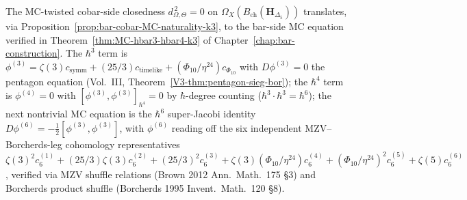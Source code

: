 \begin{remark}
\label{rem:cobar-MC-verification-k3}
The MC-twisted cobar-side closedness
$d_{\Omega,\Theta}^{\,2}=0$ on
$\Omega_X(B_{\mathrm{ch}}(\mathbf{H}_{\Delta_5}))$ translates, via
Proposition~\ref{prop:bar-cobar-MC-naturality-k3}, to the bar-side MC
equation verified in
Theorem~\ref{thm:MC-hbar3-hbar4-k3} of Chapter~\ref{chap:bar-construction}.
The $\hbar^3$ term is $\phi^{(3)} = \zeta(3)c_{\mathrm{symm}} +
(25/3)c_{\mathrm{timelike}} + (\Phi_{10}/\eta^{24})c_{\Phi_{10}}$
with $D\phi^{(3)}=0$ the pentagon equation
(Vol.~III, Theorem~\ref{V3-thm:pentagon-sieg-bor});
the $\hbar^4$ term is $\phi^{(4)}=0$ with
$[\phi^{(3)},\phi^{(3)}]_{\hbar^4}=0$ by $\hbar$-degree counting
($\hbar^3\cdot\hbar^3 = \hbar^6$); the next nontrivial MC
equation is the $\hbar^6$ super-Jacobi identity
$D\phi^{(6)} = -\tfrac{1}{2}[\phi^{(3)},\phi^{(3)}]$,
with $\phi^{(6)}$ reading off the six independent
MZV--Borcherds-leg cohomology representatives
$\zeta(3)^2 c_6^{(1)} + (25/3)\zeta(3) c_6^{(2)} + (25/3)^2 c_6^{(3)}
+ \zeta(3)(\Phi_{10}/\eta^{24})c_6^{(4)} + (\Phi_{10}/\eta^{24})^2 c_6^{(5)}
+ \zeta(5) c_6^{(6)}$, verified via MZV shuffle relations
(Brown 2012 \textup{Ann.~Math.}~175 \S 3) and Borcherds product
shuffle (Borcherds 1995 \textup{Invent.~Math.}~120 \S 8).
\end{remark}
